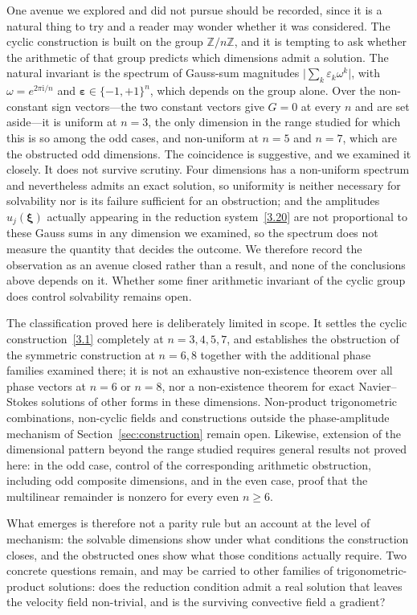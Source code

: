 \documentclass[11pt]{jfm}
\let\ge=\geqslant  \let\geq=\geqslant
\numberwithin{equation}{section}
\begin{document}
One avenue we explored and did not pursue should be recorded, since it is a natural thing to
try and a reader may wonder whether it was considered. The cyclic construction is built on the
group $\mathbb{Z}/n\mathbb{Z}$, and it is tempting to ask whether the arithmetic of that group
predicts which dimensions admit a solution. The natural invariant is the spectrum of Gauss-sum
magnitudes $\lvert\sum_k\varepsilon_k\omega^k\rvert$, with $\omega=e^{2\pi\mathrm{i}/n}$ and
$\boldsymbol{\varepsilon}\in\{-1,+1\}^n$, which depends on the group alone. Over the non-constant
sign vectors---the two constant vectors give $G=0$ at every $n$ and are set aside---it is uniform
at $n=3$,
the only dimension in the range studied for which this is so among the odd cases, and non-uniform
at $n=5$ and $n=7$, which are the obstructed odd dimensions. The coincidence is suggestive, and we
examined it closely. It does not survive scrutiny. Four dimensions has a non-uniform spectrum and
nevertheless admits an exact solution, so uniformity is neither necessary for solvability nor is
its failure sufficient for an obstruction; and the amplitudes $u_j(\boldsymbol{\xi})$ actually
appearing in the reduction system~\eqref{3.20} are not proportional to these Gauss sums in any
dimension we examined, so the spectrum does not measure the quantity that decides the outcome. We
therefore record the observation as an avenue closed rather than a result, and none of the
conclusions above depends on it. Whether some finer arithmetic invariant of the cyclic group does
control solvability remains open.

The classification proved here is deliberately limited in scope. It settles the cyclic
construction~\eqref{3.1} completely at $n=3,4,5,7$, and establishes the obstruction of the
symmetric construction at $n=6,8$ together with the additional phase families examined there; it is
not an exhaustive non-existence theorem over all phase vectors at $n=6$ or $n=8$, nor a
non-existence theorem for exact
Navier--Stokes solutions of other forms in these dimensions. Non-product trigonometric
combinations, non-cyclic fields and constructions outside the phase-amplitude mechanism of
Section~\ref{sec:construction} remain open. Likewise, extension of the dimensional pattern
beyond the range studied requires general results not proved here: in the odd case, control
of the corresponding arithmetic obstruction, including odd composite dimensions, and in the
even case, proof that the multilinear remainder is nonzero for every even $n\ge6$.

What emerges is therefore not a parity rule but an account at the level of mechanism: the
solvable dimensions show under what conditions the construction closes, and the obstructed ones
show what those conditions actually require. Two concrete questions remain, and may be carried to
other families of trigonometric-product solutions: does the reduction condition admit a real solution that leaves
the velocity field non-trivial, and is the surviving convective field a gradient?
\end{document}
